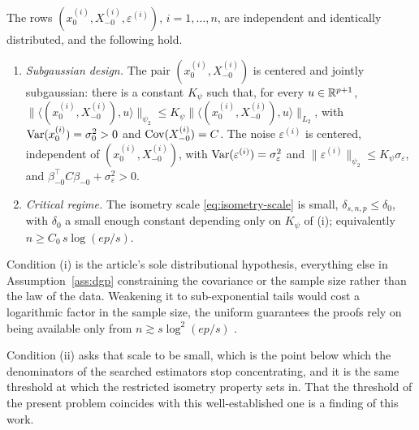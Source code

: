 \begin{assumption}\label{ass:dgp}
The rows $(x_0^{(i)}, X_{-0}^{(i)}, \varepsilon^{(i)})$, $i = 1, \dots, n$,
are independent and identically distributed, and the following hold.
\begin{enumerate}
\item[(i)] \emph{Subgaussian design.} The pair $(x_0^{(i)}, X_{-0}^{(i)})$
is centered and jointly subgaussian: there is a constant $K_\psi$ such that,
for every $u \in \mathbb{R}^{p+1}$,
$\|\langle (x_0^{(i)}, X_{-0}^{(i)}), u\rangle\|_{\psi_2}
\le K_\psi \|\langle (x_0^{(i)}, X_{-0}^{(i)}), u\rangle\|_{L_2}$, with
$\operatorname{Var}(x_0^{(i)}) = \sigma_0^2 > 0$ and $\operatorname{Cov}(X_{-0}^{(i)}) = C$. The noise
$\varepsilon^{(i)}$ is centered, independent of $(x_0^{(i)}, X_{-0}^{(i)})$,
with $\operatorname{Var}(\varepsilon^{(i)}) = \sigma_\varepsilon^2$ and
$\|\varepsilon^{(i)}\|_{\psi_2} \le K_\psi \sigma_\varepsilon$, and
$\beta_{-0}^\top C \beta_{-0} + \sigma_\varepsilon^2 > 0$.
\item[(ii)] \emph{Critical regime.} The isometry scale
\eqref{eq:isometry-scale} is small, $\delta_{s,n,p} \le \delta_0$, with
$\delta_0$ a small enough constant depending only on $K_\psi$ of (i);
equivalently $n \ge C_0\, s \log(ep/s)$.
\end{enumerate}
\end{assumption}

Condition (i) is the article's sole distributional hypothesis,
everything else in Assumption~\ref{ass:dgp} constraining the covariance
or the sample size rather than the law of the data. Weakening it to
sub-exponential tails would cost a logarithmic factor in the sample
size, the uniform guarantees the proofs rely on being available only
from $n \gtrsim s \log^2(ep/s)$ \citep{adamczak2011rip}.

Condition (ii) asks that scale to be small, which is the point below
which the denominators of the searched estimators stop concentrating,
and it is the same threshold at which the restricted isometry property
sets in. That the threshold of the present problem coincides with this
well-established one is a finding of this work.


